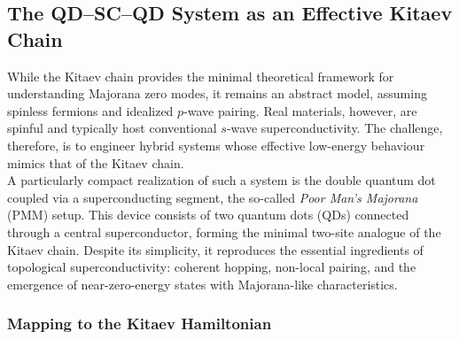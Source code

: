 \documentclass[11pt, letterpaper, titlepage]{article}
\begin{document}
\subsection{The QD–SC–QD System as an Effective Kitaev Chain}
While the Kitaev chain provides the minimal theoretical framework for understanding Majorana zero modes, it remains an abstract model, assuming spinless fermions and idealized $p$-wave pairing. Real materials, however, are spinful and typically host conventional $s$-wave superconductivity. The challenge, therefore, is to engineer hybrid systems whose effective low-energy behaviour mimics that of the Kitaev chain.\\
A particularly compact realization of such a system is the double quantum dot coupled via a superconducting segment, the so-called \textit{Poor Man’s Majorana} (PMM) setup. This device consists of two quantum dots (QDs) connected through a central superconductor, forming the minimal two-site analogue of the Kitaev chain. Despite its simplicity, it reproduces the essential ingredients of topological superconductivity: coherent hopping, non-local pairing, and the emergence of near-zero-energy states with Majorana-like characteristics.
\subsubsection{Mapping to the Kitaev Hamiltonian}
\end{document}
